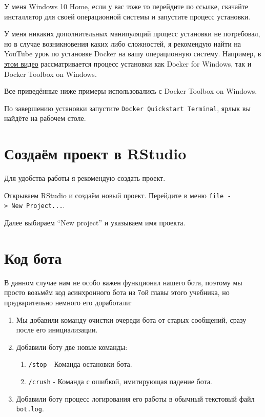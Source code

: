 \documentclass[
]{book}
\providecommand{\tightlist}{%
  \setlength{\itemsep}{0pt}\setlength{\parskip}{0pt}}
\begin{document}
У меня Windows 10 Home, если у вас тоже то перейдите по \href{https://github.com/docker-archive/toolbox/releases}{ссылке}, скачайте инсталлятор для своей операционной системы и запустите процесс установки.

У меня никаких дополнительных манипуляций процесс установки не потребовал, но в случае возникновения каких либо сложностей, я рекомендую найти на YouTube урок по установке Docker на вашу операционную систему. Например, в \href{https://www.youtube.com/watch?v=a5mxBTGfC5k}{этом видео} рассматривается процесс установки как Docker for Windows, так и Docker Toolbox on Windows.

Все приведённые ниже примеры использовались с Docker Toolbox on Windows.

По завершению установки запустите \texttt{Docker\ Quickstart\ Terminal}, ярлык вы найдёте на рабочем столе.

\section{Создаём проект в RStudio}\label{ux441ux43eux437ux434ux430ux451ux43c-ux43fux440ux43eux435ux43aux442-ux432-rstudio}

Для удобства работы я рекомендую создать проект.

Открываем RStudio и создаём новый проект. Перейдите в меню \texttt{file\ -\textgreater{}\ New\ Project...}.

Далее выбираем ``New project'' и указываем имя проекта.

\section{Код бота}\label{ux43aux43eux434-ux431ux43eux442ux430}

В данном случае нам не особо важен функционал нашего бота, поэтому мы просто возьмём код асинхронного бота из 7ой главы этого учебника, но предварительно немного его доработали:

\begin{enumerate}
\def\labelenumi{\arabic{enumi}.}
\tightlist
\item
  Мы добавили команду очистки очереди бота от старых сообщений, сразу после его инициализации.
\item
  Добавили боту две новые команды:

  \begin{enumerate}
  \def\labelenumii{\arabic{enumii}.}
  \tightlist
  \item
    \texttt{/stop} - Команда остановки бота.
  \item
    \texttt{/crush} - Команда с ошибкой, имитирующая падение бота.
  \end{enumerate}
\item
  Добавили боту процесс логирования его работы в обычный текстовый файл \texttt{bot.log}.
\end{enumerate}
\end{document}

